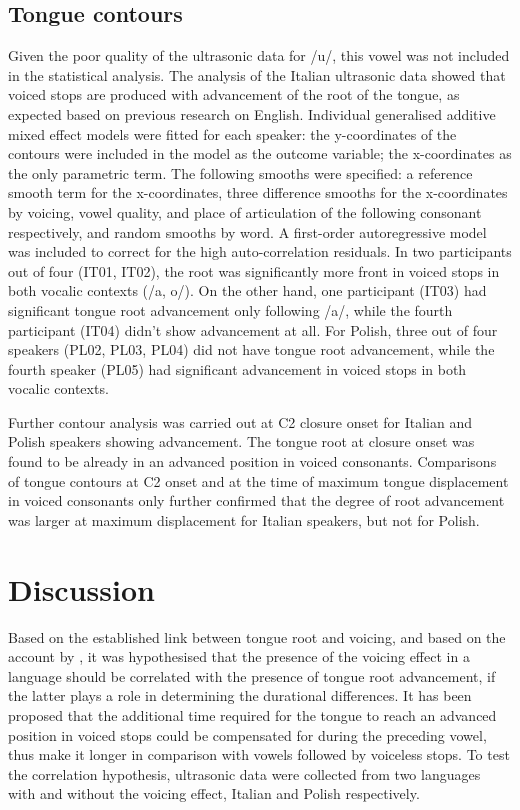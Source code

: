 \documentclass[authoryear, twocolumn]{elsarticle}
\begin{document}
\subsection{Tongue contours}\label{tongue-contours}

Given the poor quality of the ultrasonic data for /u/, this vowel was
not included in the statistical analysis. The analysis of the Italian
ultrasonic data showed that voiced stops are produced with advancement
of the root of the tongue, as expected based on previous research on
English. Individual generalised additive mixed effect models were fitted
for each speaker: the y-coordinates of the contours were included in the
model as the outcome variable; the x-coordinates as the only parametric
term. The following smooths were specified: a reference smooth term for
the x-coordinates, three difference smooths for the x-coordinates by
voicing, vowel quality, and place of articulation of the following
consonant respectively, and random smooths by word. A first-order
autoregressive model was included to correct for the high
auto-correlation residuals. In two participants out of four (IT01,
IT02), the root was significantly more front in voiced stops in both
vocalic contexts (/a, o/). On the other hand, one participant (IT03) had
significant tongue root advancement only following /a/, while the fourth
participant (IT04) didn't show advancement at all. For Polish, three out
of four speakers (PL02, PL03, PL04) did not have tongue root
advancement, while the fourth speaker (PL05) had significant advancement
in voiced stops in both vocalic contexts.

Further contour analysis was carried out at C2 closure onset for Italian
and Polish speakers showing advancement. The tongue root at closure
onset was found to be already in an advanced position in voiced
consonants. Comparisons of tongue contours at C2 onset and at the time
of maximum tongue displacement in voiced consonants only further
confirmed that the degree of root advancement was larger at maximum
displacement for Italian speakers, but not for Polish.

\section{Discussion}\label{discussion}

Based on the established link between tongue root and voicing, and based
on the account by \citet{halle1967}, it was hypothesised that the
presence of the voicing effect in a language should be correlated with
the presence of tongue root advancement, if the latter plays a role in
determining the durational differences. It has been proposed that the
additional time required for the tongue to reach an advanced position in
voiced stops could be compensated for during the preceding vowel, thus
make it longer in comparison with vowels followed by voiceless stops. To
test the correlation hypothesis, ultrasonic data were collected from two
languages with and without the voicing effect, Italian and Polish
respectively.
\end{document}
